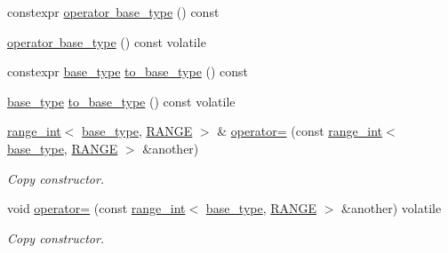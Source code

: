\begin{DoxyCompactItemize}
constexpr \mbox{\hyperlink{classfsl_1_1lg_1_1range__int_aa7a3f65fd702219d850343d11519f202}{operator base\+\_\+type}} () const
\item 
\mbox{\hyperlink{classfsl_1_1lg_1_1range__int_abbb4762274cbe4d40f4f63bb81e7452e}{operator base\+\_\+type}} () const volatile
\item 
constexpr \mbox{\hyperlink{classfsl_1_1lg_1_1range__int_a4ce67cd216fd303b7bae83a7cbcab3bb}{base\+\_\+type}} \mbox{\hyperlink{classfsl_1_1lg_1_1range__int_ae9956b3fbe041d46b53e07b0284d6d6d}{to\+\_\+base\+\_\+type}} () const
\item 
\mbox{\hyperlink{classfsl_1_1lg_1_1range__int_a4ce67cd216fd303b7bae83a7cbcab3bb}{base\+\_\+type}} \mbox{\hyperlink{classfsl_1_1lg_1_1range__int_a0aee35f66c35553f8057b113fdf5ba68}{to\+\_\+base\+\_\+type}} () const volatile
\item 
\mbox{\label{classfsl_1_1lg_1_1range__int_afc23f9e28319fcb8d77835e7a3db25a1}} 
\mbox{\hyperlink{classfsl_1_1lg_1_1range__int}{range\+\_\+int}}$<$ \mbox{\hyperlink{classfsl_1_1lg_1_1range__int_a4ce67cd216fd303b7bae83a7cbcab3bb}{base\+\_\+type}}, \mbox{\hyperlink{classfsl_1_1lg_1_1range__int_a438be32af68025525703578ac9fdcd09}{R\+A\+N\+GE}} $>$ \& \mbox{\hyperlink{classfsl_1_1lg_1_1range__int_afc23f9e28319fcb8d77835e7a3db25a1}{operator=}} (const \mbox{\hyperlink{classfsl_1_1lg_1_1range__int}{range\+\_\+int}}$<$ \mbox{\hyperlink{classfsl_1_1lg_1_1range__int_a4ce67cd216fd303b7bae83a7cbcab3bb}{base\+\_\+type}}, \mbox{\hyperlink{classfsl_1_1lg_1_1range__int_a438be32af68025525703578ac9fdcd09}{R\+A\+N\+GE}} $>$ \&another)
\begin{DoxyCompactList}\small\item\em Copy constructor. \end{DoxyCompactList}\item 
\mbox{\label{classfsl_1_1lg_1_1range__int_a2d9d48a6a79e40adf9dfb44bf19674a6}} 
void \mbox{\hyperlink{classfsl_1_1lg_1_1range__int_a2d9d48a6a79e40adf9dfb44bf19674a6}{operator=}} (const \mbox{\hyperlink{classfsl_1_1lg_1_1range__int}{range\+\_\+int}}$<$ \mbox{\hyperlink{classfsl_1_1lg_1_1range__int_a4ce67cd216fd303b7bae83a7cbcab3bb}{base\+\_\+type}}, \mbox{\hyperlink{classfsl_1_1lg_1_1range__int_a438be32af68025525703578ac9fdcd09}{R\+A\+N\+GE}} $>$ \&another) volatile
\begin{DoxyCompactList}\small\item\em Copy constructor. \end{DoxyCompactList}\item 

\end{DoxyCompactItemize}
